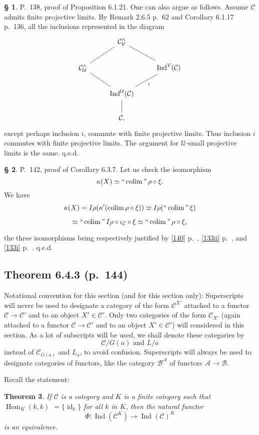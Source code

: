 \documentclass[12pt]{article}
\newtheorem{thm}{Theorem}
\theoremstyle{remark}
\theoremstyle{definition}
\newtheorem{s}[thm]{\S}
\newcommand{\A}{\mathcal A}
\newcommand{\B}{\mathcal B}
\newcommand{\C}{\mathcal C}
\newcommand{\U}{\mathcal U}
\newcommand{\V}{\mathcal V}
\DeclareMathOperator*{\coli}{colim}
\DeclareMathOperator*{\co}{colim}
\DeclareMathOperator*{\ic}{``\coli"}
\DeclareMathOperator{\id}{id}
\DeclareMathOperator{\Hom}{Hom}%
\DeclareMathOperator{\Ind}{Ind}
\begin{document}
%
%
\begin{s} 
P.~138, proof of Proposition 6.1.21. One can also argue as follows. Assume $\C$ admits finite projective limits. By Remark 2.6.5 p.~62 and Corollary 6.1.17 p.~136, all the inclusions represented in the diagram 
\[
\begin{tikzcd}
{}&\C^\wedge_\V\ar[-]{ld}\ar[-]{rd}\\
\C^\wedge_\U\ar[-]{rd}&&\Ind^\V(\C)\ar[-]{ld}{i}\\
&\Ind^\U(\C)\ar[-]{d}\\
&\C,
\end{tikzcd}
\]
except perhaps inclusion $i$, commute with finite projective limits. Thus inclusion $i$ commutes with finite projective limits. The argument for $\U$-small projective limits is the same. q.e.d.
\end{s}
%
%
\begin{s} P.~142, proof of Corollary 6.3.7. Let us check the isomorphism 
$$
\kappa(X)\simeq\ic\rho\circ\xi. 
$$ 
We have 
$$
\kappa(X)=I\rho(\kappa'(\co\rho\circ\xi))\simeq I\rho(\ic\xi)
$$

$$
\simeq\ic I\rho\circ\iota_\C\circ\xi\simeq\ic\rho\circ\xi, 
$$ 

\noindent the three isomorphisms being respectively justified by \eqref{140} p.~\pageref{140}, \eqref{133ii} p.~\pageref{133ii}, and \eqref{133i} p.~\pageref{133i}. q.e.d.
\end{s}
%
%
\subsection{Theorem 6.4.3 (p.~144)}
%
Notational convention for this section (and for this section only): Superscripts will never be used to designate a category of the form $\C^{X'}$ attached to a functor $\C\to\C'$ and to an object $X'\in\C'$. Only two categories of the form $\C_{X'}$ (again attached to a functor $\C\to\C'$ and to an object $X'\in\C'$) will considered in this section. As a lot of subscripts will be used, we shall denote these categories by 
%
\begin{equation}\label{slice}
\C/G(a)\text{ and }L/a
\end{equation}
%
instead of $\C_{G(a)}$ and $L_a$, to avoid confusion. Superscripts will always be used to designate categories of functors, like the category $\B^\A$ of functors $\A\to\B$. 

Recall the statement: 
%
\begin{thm}
If $\C$ is a category and $K$ is a finite category such that $\Hom_K(k,k)$ $=\{\id_k\}$ for all $k$ in $K$, then the natural functor 
$$
\Phi:\Ind(\C^K)\to\Ind(\C)^K
$$ 
is an equivalence.
\end{thm}
%
\end{document}

